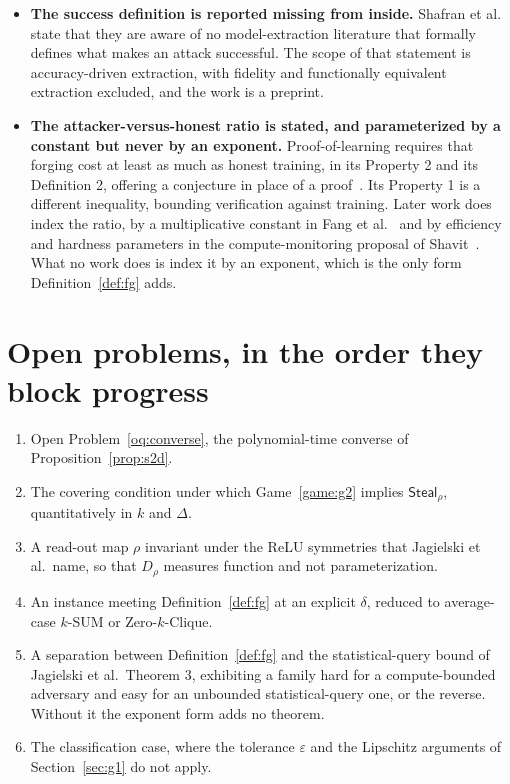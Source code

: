 \documentclass[11pt]{article}
\theoremstyle{definition}
\theoremstyle{plain}
\begin{document}
\begin{itemize}
        from real-valued oracle access. The attack uses polynomially many queries
        but work exponential in layer width for sign recovery, and it is empirical.
  \item \textbf{The success definition is reported missing from inside.} Shafran et
        al.~\cite{SSEP24} state that they are aware of no model-extraction
        literature that formally defines what makes an attack successful. The scope
        of that statement is accuracy-driven extraction, with fidelity and
        functionally equivalent extraction excluded, and the work is a preprint.
  \item \textbf{The attacker-versus-honest ratio is stated, and parameterized by a
        constant but never by an exponent.} Proof-of-learning requires that forging
        cost at least as much as honest training, in its Property 2 and its
        Definition 2, offering a conjecture in place of a proof~\cite{JYCDTCP21}.
        Its Property 1 is a different inequality, bounding verification against
        training. Later work does index the ratio, by a multiplicative constant in
        Fang et al.~\cite{ZFWCSXZ26} and by efficiency and hardness parameters in
        the compute-monitoring proposal of Shavit~\cite{Sha23}. What no work does is
        index it by an exponent, which is the only form Definition~\ref{def:fg}
        adds.
\end{itemize}

\section{Open problems, in the order they block progress}

\begin{enumerate}
  \item Open Problem~\ref{oq:converse}, the polynomial-time converse of
        Proposition~\ref{prop:s2d}.
  \item The covering condition under which Game~\ref{game:g2} implies
        $\mathsf{Steal}_\rho$, quantitatively in $k$ and $\Delta$.
  \item A read-out map $\rho$ invariant under the ReLU symmetries that Jagielski et
        al.\ name, so that $D_\rho$ measures function and not parameterization.
  \item An instance meeting Definition~\ref{def:fg} at an explicit $\delta$,
        reduced to average-case $k$-SUM or Zero-$k$-Clique.
  \item A separation between Definition~\ref{def:fg} and the statistical-query
        bound of Jagielski et al.\ Theorem 3, exhibiting a family hard for a
        compute-bounded adversary and easy for an unbounded statistical-query one,
        or the reverse. Without it the exponent form adds no theorem.
  \item The classification case, where the tolerance $\varepsilon$ and the
        Lipschitz arguments of Section~\ref{sec:g1} do not apply.
\end{enumerate}



\end{document}
